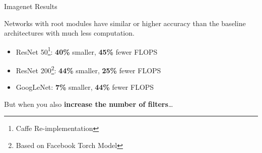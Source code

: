 \documentclass[t,xcolor=dvipsnames]{beamer}
\begin{document}

\begin{frame}{Imagenet Results}

Networks with root modules have similar or higher accuracy than the baseline architectures with much less computation.
\begin{itemize}
    \item ResNet 50\footnote{Caffe Re-implementation}: \textbf{40\%} smaller, \textbf{45\%} fewer FLOPS%
    \item ResNet 200\footnote{Based on Facebook Torch Model}: \textbf{44\%} smaller, \textbf{25\%} fewer FLOPS
    \item GoogLeNet: \textbf{7\%} smaller, \textbf{44\%} fewer FLOPS%
\end{itemize}
\vfill
But when you also \textbf{increase the number of filters}\ldots
\end{frame}

\end{document}
